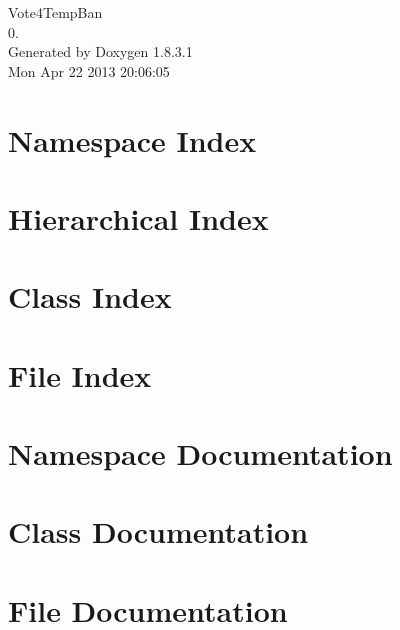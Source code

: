 \documentclass{book}
\begin{document}
\hypersetup{pageanchor=false,citecolor=blue}
\begin{titlepage}
\vspace*{7cm}
\begin{center}
{\Large Vote4\-Temp\-Ban \\[1ex]\large 0. }\\
\vspace*{1cm}
{\large Generated by Doxygen 1.8.3.1}\\
\vspace*{0.5cm}
{\small Mon Apr 22 2013 20:06:05}\\
\end{center}
\end{titlepage}
\clearemptydoublepage
{}
\tableofcontents
\clearemptydoublepage
{}
\hypersetup{pageanchor=true,citecolor=blue}
\chapter{Namespace Index}

\chapter{Hierarchical Index}

\chapter{Class Index}

\chapter{File Index}

\chapter{Namespace Documentation}




\chapter{Class Documentation}



\chapter{File Documentation}



\printindex
\end{document}
